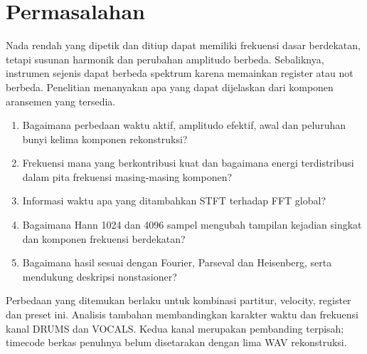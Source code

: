 \section{Permasalahan}
Nada rendah yang dipetik dan ditiup dapat memiliki frekuensi dasar
berdekatan, tetapi susunan harmonik dan perubahan amplitudo berbeda.
Sebaliknya, instrumen sejenis dapat berbeda spektrum karena memainkan
register atau not berbeda. Penelitian menanyakan apa yang dapat
dijelaskan dari komponen aransemen yang tersedia.
\begin{enumerate}
\item Bagaimana perbedaan waktu aktif, amplitudo efektif, awal dan
peluruhan bunyi kelima komponen rekonstruksi?
\item Frekuensi mana yang berkontribusi kuat dan bagaimana energi
terdistribusi dalam pita frekuensi masing-masing komponen?
\item Informasi waktu apa yang ditambahkan STFT terhadap FFT global?
\item Bagaimana Hann 1024 dan 4096 sampel mengubah tampilan kejadian
singkat dan komponen frekuensi berdekatan?
\item Bagaimana hasil sesuai dengan Fourier, Parseval dan Heisenberg,
serta mendukung deskripsi nonstasioner?
\end{enumerate}
Perbedaan yang ditemukan berlaku untuk kombinasi partitur, velocity,
register dan preset ini. Analisis tambahan membandingkan karakter
waktu dan frekuensi kanal DRUMS dan VOCALS. Kedua kanal merupakan
pembanding terpisah; timecode berkas penuhnya belum disetarakan dengan
lima WAV rekonstruksi.

